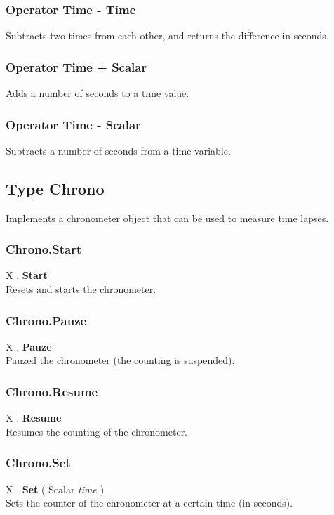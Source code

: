 \subsubsection{Operator Time - Time \label{O:Time-Time}}
Subtracts two times from each other, and returns the difference in seconds.

\subsubsection{Operator Time + Scalar \label{O:Time+Scalar}}
Adds a number of seconds to a time value.

\subsubsection{Operator Time - Scalar \label{O:Time-Scalar}}
Subtracts a number of seconds from a time variable.

\subsection{Type Chrono \label{T:Chrono}}
Implements a chronometer object that can be used to measure time lapses.

\subsubsection{Chrono.Start \label{F:Chrono:Start}}
X . \textbf{Start} \\
Resets and starts the chronometer.

\subsubsection{Chrono.Pauze \label{F:Chrono:Pauze}}
X . \textbf{Pauze} \\
Pauzed the chronometer (the counting is suspended).

\subsubsection{Chrono.Resume \label{F:Chrono:Resume}}
X . \textbf{Resume} \\
Resumes the counting of the chronometer.

\subsubsection{Chrono.Set \label{F:Chrono:Set}}
X . \textbf{Set} ( Scalar \textit{time} ) \\
Sets the counter of the chronometer at a certain time (in seconds).

